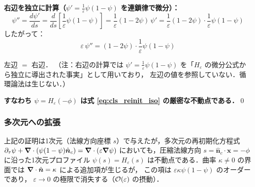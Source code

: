 \textbf{右辺を独立に計算（$\psi' = \tfrac{1}{\varepsilon}\psi(1-\psi)$ を連鎖律で微分）：}
\[
  \psi'' = \frac{d\psi'}{ds}
         = \frac{d}{ds}\!\left[\frac{1}{\varepsilon}\psi(1-\psi)\right]
         = \frac{1}{\varepsilon}(1-2\psi)\,\psi'
         = \frac{1}{\varepsilon}(1-2\psi)\cdot\frac{1}{\varepsilon}\psi(1-\psi)
\]
したがって：
\[
  \varepsilon\,\psi''
  = (1-2\psi)\cdot\frac{1}{\varepsilon}\psi(1-\psi)
\]

左辺 $=$ 右辺．
（注：右辺の計算では $\psi' = \tfrac{1}{\varepsilon}\psi(1-\psi)$ を「$H_\varepsilon$ の微分公式から独立に導出された事実」として用いており，
左辺の値を参照していない．循環論法は生じない．）

\textbf{すなわち $\psi = H_\varepsilon(-\phi)$ は式 \eqref{eq:cls_reinit_iso} の厳密な不動点である．}\qed

\subsubsection*{多次元への拡張}

上記の証明は1次元（法線方向座標 $s$）で与えたが，多次元の再初期化方程式
$\partial_\tau\psi + \bm{\nabla}\cdot(\psi(1-\psi)\hat{\bm{n}}_c) = \bm{\nabla}\cdot(\varepsilon\bm{\nabla}\psi)$
においても，圧縮法線方向 $s = \hat{\bm{n}}_c\cdot\bm{x}=-\phi$ に沿った1次元プロファイル
$\psi(s) = H_\varepsilon(s)$ は不動点である．曲率 $\kappa \neq 0$ の界面では
$\bm{\nabla}\cdot\hat{\bm{n}} = \kappa$ による追加項が生じるが，
この項は $\varepsilon\kappa\psi(1-\psi)$ のオーダーであり，
$\varepsilon \to 0$ の極限で消失する（$\mathcal{O}(\varepsilon)$ の摂動）．
